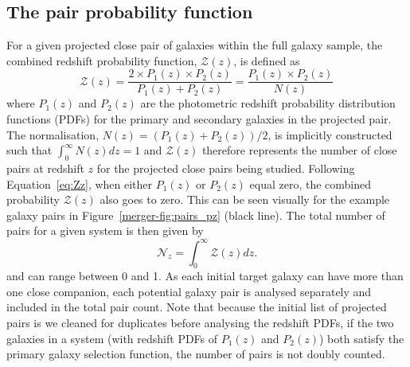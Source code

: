 \subsection{The pair probability function}\label{merger-sec:ppf}
For a given projected close pair of galaxies within the full galaxy sample, the combined redshift probability function, $\mathcal{Z}(z)$, is defined as
\begin{equation}\label{eq:Zz}
\mathcal{Z}(z) = \frac{2 \times P_{1}(z) \times P_{2}(z)}{P_{1}(z) + P_{2}(z)} =
\frac{P_{1}(z) \times P_{2}(z)}{N(z)}
\end{equation}
where $P_{1}(z)$ and $P_{2}(z)$ are the photometric redshift probability distribution functions (PDFs) for the primary and secondary galaxies in the projected pair. The normalisation, \(N(z) = (P_{1}(z) + P_{2}(z))/2\), is implicitly constructed such that \(\int_{0}^{\infty} N(z) dz = 1 \) and $\mathcal{Z}(z)$ therefore represents the number of close pairs at redshift $z$ for the projected close pairs being studied. Following Equation~\ref{eq:Zz}, when either $P_{1}(z)$ or $P_{2}(z)$ equal zero, the combined probability $\mathcal{Z}(z)$ also goes to zero. This can be seen visually for the example galaxy pairs in Figure~\ref{merger-fig:pairs_pz} (black line). The total number of pairs for a given system is then given by
\begin{equation}
	\mathcal{N}_{z} = \int_{0}^{\infty} \mathcal{Z}(z) dz.
\end{equation}
and can range between 0 and 1. As each initial target galaxy can have more than one close companion, each potential galaxy pair is analysed separately and included in the total pair count. Note that because the initial list of projected pairs is we cleaned for duplicates before analysing the redshift PDFs, if the two galaxies in a system (with redshift PDFs of $P_{1}(z)$ and $P_{2}(z)$) both satisfy the primary galaxy selection function, the number of pairs is not doubly counted. 

